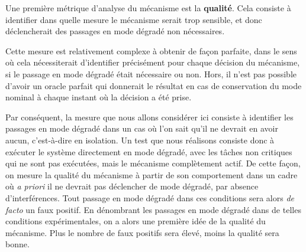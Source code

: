 \documentclass[french, a4paper, 11pt, twoside, pdftex]{StyleThese}
\begin{document}
    	Une première métrique d'analyse du mécanisme est la \textbf{qualité}. Cela consiste à identifier dans quelle mesure le mécanisme serait trop sensible, et donc déclencherait des passages en mode dégradé non nécessaires.
    	
    	Cette mesure est relativement complexe à obtenir de façon parfaite, dans le sens où cela nécessiterait d'identifier précisément pour chaque décision du mécanisme, si le passage en mode dégradé était nécessaire ou non. Hors, il n'est pas possible d'avoir un oracle parfait qui donnerait le résultat en cas de conservation du mode nominal à chaque instant où la décision a été prise. 
    	
    	Par conséquent, la mesure que nous allons considérer ici consiste à identifier les passages en mode dégradé dans un cas où l'on sait qu'il ne devrait en avoir aucun, c'est-à-dire en isolation. 
    	Un test que nous réalisons consiste donc à exécuter le système directement en mode dégradé, avec les tâches non critiques qui ne sont pas exécutées, mais le mécanisme complètement actif.
    	De cette façon, on mesure la qualité du mécanisme à partir de son comportement dans un cadre où \textit{a priori} il ne devrait pas déclencher de mode dégradé, par absence d'interférences. Tout passage en mode dégradé dans ces conditions sera alors \textit{de facto} un faux positif.
    	En dénombrant les passages en mode dégradé dans de telles conditions expérimentales, on a alors une première idée de la qualité du mécanisme. Plus le nombre de faux positifs sera élevé, moins la qualité sera bonne.
    	
\end{document}
